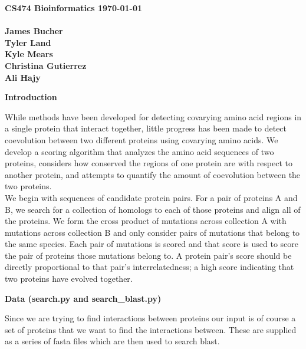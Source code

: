\documentclass[11pt]{article}
\date{\today}
\begin{document}
\textbf{CS474 Bioinformatics \hfill \today\ \\
\\
James Bucher \\
Tyler Land \\
Kyle Mears \\
Christina Gutierrez \\
Ali Hajy}

\begin{center}
\textbf{Introduction}
\end{center}
While methods have been developed for detecting covarying amino acid regions in a single protein that interact together, little progress has been made to detect coevolution between two different proteins using covarying amino acids.  We develop a scoring algorithm that analyzes the amino acid sequences of two proteins, considers how conserved the regions of one protein are with respect to another protein, and attempts to quantify the amount of coevolution between the two proteins. \\

We begin with sequences of candidate protein pairs.  For a pair of proteins A and B, we search for a collection of homologs to each of those proteins and align all of the proteins.  We form the cross product of mutations across collection A with mutations across collection B and only consider pairs of mutations that belong to the same species.  Each pair of mutations is scored and that score is used to score the pair of proteins those mutations belong to.  A protein pair's score should be directly proportional to that pair's interrelatedness; a high score indicating that two proteins have evolved together.

\begin{center}
\textbf{Data (search.py and search\_blast.py)}
\end{center}
Since we are trying to find interactions between proteins our input is
of course a set of proteins that we want to find the interactions
between. These are supplied as a series of fasta files which are then
used to search blast. \\
\end{document}
